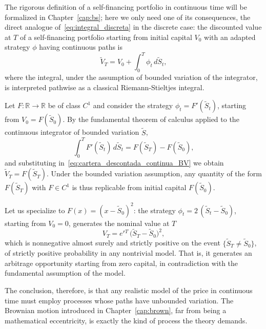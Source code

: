 \documentclass[11pt,a4paper,oneside]{report}
\theoremstyle{plain}
\theoremstyle{definition}
\theoremstyle{remark}
\newcommand{\R}{\mathbb{R}}
\newcommand{\1}{\mathbf{1}}
\begin{document}
The rigorous definition of a self-financing portfolio in continuous
time will be formalized in Chapter~\ref{cap:bs}; here we only need
one of its consequences, the direct analogue
of~\eqref{eq:integral_discreta} in the discrete case: the discounted
value at $T$ of a self-financing portfolio starting from initial
capital $V_0$ with an adapted strategy $\phi$ having continuous paths
is
\begin{equation}\label{eq:cartera_descontada_continua_BV}
  \widetilde V_T = V_0 + \int_0^T \phi_t\, d\widetilde S_t,
\end{equation}
where the integral, under the assumption of bounded variation of the
integrator, is interpreted pathwise as a classical
Riemann-Stieltjes integral.

Let $F : \R \to \R$ be of class $C^1$ and consider the strategy
$\phi_t = F'(\widetilde S_t)$, starting from $V_0 = F(\widetilde S_0)$.
By the fundamental theorem of calculus applied to the continuous
integrator of bounded variation $\widetilde S$,
\begin{equation*}
  \int_0^T F'(\widetilde S_t)\, d\widetilde S_t
  = F(\widetilde S_T) - F(\widetilde S_0),
\end{equation*}
and substituting in~\eqref{eq:cartera_descontada_continua_BV} we
obtain $\widetilde V_T = F(\widetilde S_T)$. Under the bounded
variation assumption, any quantity of the form $F(\widetilde S_T)$
with $F\in C^1$ is thus replicable from initial capital
$F(\widetilde S_0)$.

Let us specialize to $F(x) = (x - \widetilde S_0)^2$: the strategy
$\phi_t = 2\,(\widetilde S_t - \widetilde S_0)$, starting from
$V_0 = 0$, generates the nominal value at $T$
\begin{equation*}
  V_T = e^{rT}\,\bigl(\widetilde S_T - \widetilde S_0\bigr)^2,
\end{equation*}
which is nonnegative almost surely and strictly positive on the event
$\{\widetilde S_T \neq \widetilde S_0\}$, of strictly positive
probability in any nontrivial model. That is, it generates an
arbitrage opportunity starting from zero capital, in contradiction
with the fundamental assumption of the model.

The conclusion, therefore, is that any realistic model of the price
in continuous time must employ processes whose paths have unbounded
variation. The Brownian motion introduced in Chapter~\ref{cap:brown},
far from being a mathematical eccentricity, is exactly the kind of
process the theory demands.
\end{document}
